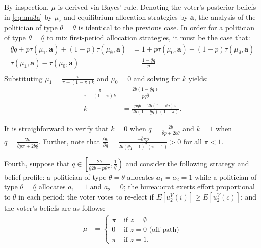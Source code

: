 \documentclass[11pt,english]{article}
\begin{document}
By inspection, $\mu$ is derived via Bayes' rule. Denoting the voter's posterior beliefs in \eqref{eq:mu3a} by $\mu_z$ and equilibrium allocation strategies by $\boldsymbol{a}$, the analysis of the politician of type $\theta = \overline{\theta}$ is identical to the previous case. In order for a politician of type $\theta = \underline{\theta}$ to mix first-period allocation strategies, it must be the case that: 
\begin{align*}
\underline{\theta}q + p\tau(\mu_1, \boldsymbol{a}) + (1-p)\tau( \mu_\emptyset, \boldsymbol{a}) &= 1 + p \tau(\mu_0, \boldsymbol{a}) + (1-p)\tau( \mu_{\emptyset}, \boldsymbol{a})\\
\tau( \mu_1, \boldsymbol{a}) - \tau(\mu_0, \boldsymbol{a}) &= \frac{1-\underline{\theta}q}{p}\\
\end{align*} 
Substituting $\mu_1 = \frac{\pi}{\pi + (1-\pi)k}$ and $\mu_0 = 0$ and solving for $k$ yields:
\begin{align*}
\frac{\pi}{\pi + (1-\pi)k} &=\frac{2b(1- \underline{\theta}q)}{p q\overline{\theta}}\\
k &= \frac{pq\overline{\theta}-2b(1-\underline{\theta}q)\pi}{2b(1-\underline{\theta}q)(1-\pi)}. 
\end{align*}

It is straighforward to verify that $k =0 $ when $q = \frac{2b}{\overline{\theta}p + 2 b \underline{\theta}}$ and $k = 1$ when $q = \frac{2b}{\overline{\theta} p \pi + 2 b \underline{\theta}}$. Further, note that $\frac{\partial k}{\partial q} = \frac{-\overline{\theta} \pi p}{2b(\underline{\theta} q -1)^2(\pi - 1)} > 0$ for all $\pi < 1$. 

Fourth, suppose that $q \in \left[\frac{2b}{\underline{\theta}2b + p\overline{\theta}\pi}, \frac{1}{\underline{\theta}}\right)$ and consider the following strategy and belief profile: a politician of type $\theta = \overline{\theta}$ allocates $a_1 = a_2 = 1$ while a politician of type $\theta = \underline{\theta}$ allocates $a_1 = 1$ and $a_2 = 0$;  the bureaucrat exerts effort proportional to $\theta$ in each period; the voter votes to re-elect if $E[u_2^V(i)] \geq E[u_2^V(c)]$; and the voter's beliefs are as follows:
\begin{align}\label{eq:mu4a}
\mu &= \begin{cases}
\pi & \text{ if } z = \emptyset\\
0 & \text{ if } z = 0 \text{ (off-path)}\\
\pi & \text{ if } z= 1. 
\end{cases}
\end{align}
\end{document}
